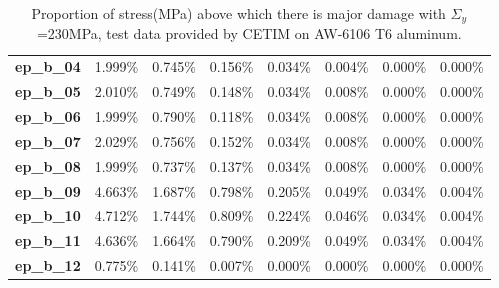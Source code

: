\begin{table}[!h]
\begin{tabular}{llllllll}
\textbf{ep\_b\_04}           & 1.999\%        & 0.745\%        & 0.156\%        & 0.034\%         & 0.004\%         & 0.000\%         & 0.000\%         \\
\textbf{ep\_b\_05}           & 2.010\%        & 0.749\%        & 0.148\%        & 0.034\%         & 0.008\%         & 0.000\%         & 0.000\%         \\
\textbf{ep\_b\_06}           & 1.999\%        & 0.790\%        & 0.118\%        & 0.034\%         & 0.008\%         & 0.000\%         & 0.000\%         \\
\textbf{ep\_b\_07}           & 2.029\%        & 0.756\%        & 0.152\%        & 0.034\%         & 0.008\%         & 0.000\%         & 0.000\%         \\
\textbf{ep\_b\_08}           & 1.999\%        & 0.737\%        & 0.137\%        & 0.034\%         & 0.008\%         & 0.000\%         & 0.000\%         \\
\textbf{ep\_b\_09}           & 4.663\%        & 1.687\%        & 0.798\%        & 0.205\%         & 0.049\%         & 0.034\%         & 0.004\%         \\
\textbf{ep\_b\_10}           & 4.712\%        & 1.744\%        & 0.809\%        & 0.224\%         & 0.046\%         & 0.034\%         & 0.004\%         \\
\textbf{ep\_b\_11}           & 4.636\%        & 1.664\%        & 0.790\%        & 0.209\%         & 0.049\%         & 0.034\%         & 0.004\%         \\
\textbf{ep\_b\_12}           & 0.775\%        & 0.141\%        & 0.007\%        & 0.000\%         & 0.000\%         & 0.000\%         & 0.000\%         \\ \hline
\end{tabular}
\caption{Proportion of stress(MPa) above which there is major damage with $\Sigma_y$=230MPa, test data provided by CETIM on AW-6106 T6 aluminum.}
\label{tab.majordamage}
\end{table}

